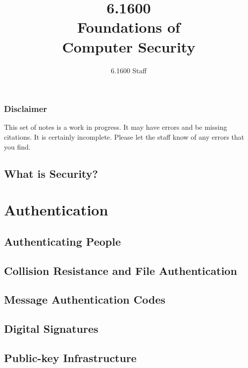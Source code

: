 \documentclass[
letterpaper, %
oneside
]{tufte-book}
\author{6.1600 Staff}
\title{6.1600\\Foundations of\\Computer Security}
\begin{document}
\mainmatter

\maketitle

\section{Disclaimer}
This set of notes is a work in progress. It may have errors and be missing citations. It is certainly incomplete. Please let the staff know of any errors that you find.

\clearpage

\tableofcontents*
\clearpage


\chapter{What is Security?}



\part{Authentication}
\chapter{Authenticating People}



\chapter{Collision Resistance and File Authentication}



\chapter{Message Authentication Codes}



\chapter{Digital Signatures}



\chapter{Public-key Infrastructure}
\end{document}
